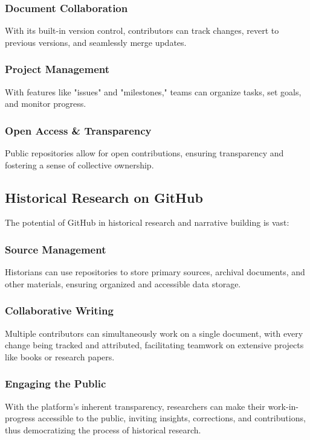 \documentclass{book}
\begin{document}
\subsubsection*{Document Collaboration}
With its built-in version control, contributors can track changes, revert to previous versions, and seamlessly merge updates.

\subsubsection*{Project Management}
With features like "issues" and "milestones," teams can organize tasks, set goals, and monitor progress.

\subsubsection*{Open Access \& Transparency}
Public repositories allow for open contributions, ensuring transparency and fostering a sense of collective ownership.

\subsection*{Historical Research on GitHub}
The potential of GitHub in historical research and narrative building is vast:

\subsubsection*{Source Management}
Historians can use repositories to store primary sources, archival documents, and other materials, ensuring organized and accessible data storage.

\subsubsection*{Collaborative Writing}
Multiple contributors can simultaneously work on a single document, with every change being tracked and attributed, facilitating teamwork on extensive projects like books or research papers.

\subsubsection*{Engaging the Public}
With the platform's inherent transparency, researchers can make their work-in-progress accessible to the public, inviting insights, corrections, and contributions, thus democratizing the process of historical research.
\end{document}
